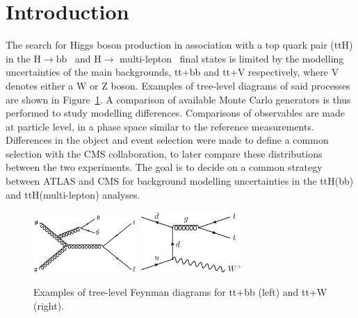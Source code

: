 \section{Introduction}
\label{sec:intro}
The search for Higgs boson production in association with a top quark pair (ttH) in the $\mathrm{H\rightarrow bb}$~\cite{HIGG-2017-03} and $\mathrm{H\rightarrow}$ multi-lepton~\cite{ATLAS-CONF-2019-045} final states is limited by the modelling uncertainties of the main backgrounds, tt+bb and tt+V respectively, where V denotes either a W or Z boson. Examples of tree-level diagrams of said processes are shown in Figure~\ref{intro:sig}. A comparison of available Monte Carlo generators is thus performed to study modelling differences. Comparisons of observables are made at particle level, in a phase space similar to the reference measurements. Differences in the object and event selection were made to define a common selection with the CMS collaboration, to later compare these distributions between the two experiments. The goal is to decide on a common strategy between ATLAS and CMS for background modelling uncertainties in the ttH(bb) and ttH(multi-lepton) analyses.

\begin{figure}[!htb]
\centering
\includegraphics[width=0.35\textwidth]{Plots/ttbb/ttbb}
\includegraphics[width=0.35\textwidth]{Plots/ttV/ttW}
  \caption{Examples of tree-level Feynman diagrams for tt+bb (left) and tt+W (right). \label{intro:sig}}
\end{figure}